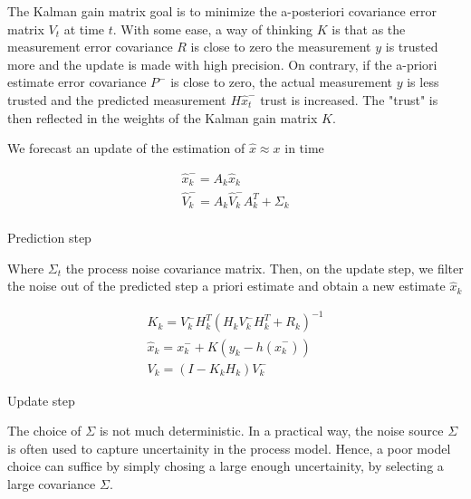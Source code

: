 \documentclass[mscthesis]{usiinfthesis}
\begin{document}
The Kalman gain matrix goal is to minimize the a-posteriori covariance error matrix $V_t$ at time $t$. With some ease, a way of thinking $K$ is that as the measurement error covariance $R$ is close to zero the measurement $y$ is trusted more and the update is made with high precision. On contrary, if the a-priori estimate error covariance $P^-$ is close to zero, the actual measurement $y$ is less trusted and the predicted measurement $H\hat{x}_t^-$ trust is increased. The "trust" is then reflected in the weights of the Kalman gain matrix $K$.

We forecast an update of the estimation of $\hat{x} \approx x$ in time

\begin{eqfloat}[H]
\begin{equation}
\begin{array}{l}
\hat{x}_k^- = A_k \hat{x}_k  \\
\hat{V}_k^- = A_k \hat{V}_k^- A_k^T + \Sigma_k \\
\end{array}
\label{eq:kalman_predict}
\end{equation}
\caption{Prediction step}
\label{eq:linear_kalmann_prediction}
\end{eqfloat}

Where $\Sigma_{t}$ the process noise covariance matrix. Then, on the update step, we filter the noise out of the predicted step a priori estimate and obtain a new estimate $\hat{x}_k$

\begin{eqfloat}[H]
\begin{equation}
\begin{array}{l}
K_k = V_k^- H^T_k (H_k V_k^- H^T_k + R_k)^{-1} \\
\hat{x}_k = x_k^- + K (y_k - h(\hat{x}_k^-)) \\
V_k = (I-K_k H_k)V_k^-
\end{array}
\label{eq:kalman_update}
\end{equation}
\caption{Update step}
\label{eq:linear_kalmann_update}
\end{eqfloat}

The choice of $\Sigma$ is not much deterministic. In a practical way, the noise source $\Sigma$ is often used to capture uncertainity in the process model. Hence, a poor model choice can suffice by simply chosing a large enough uncertainity, by selecting a large covariance $\Sigma$. 


\end{document}
